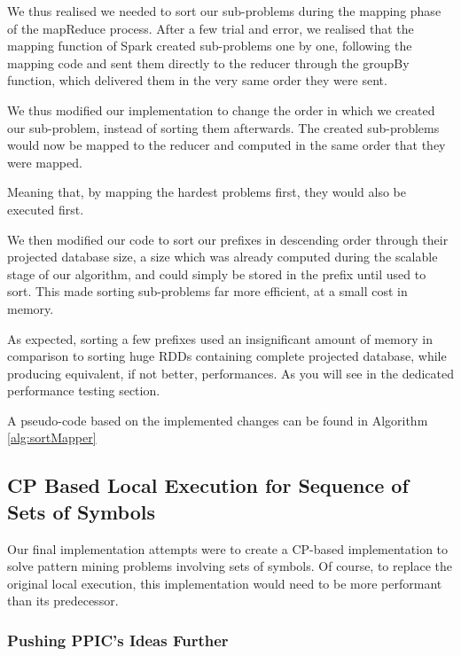 \documentclass{eplmastersthesis}
\begin{document}
We thus realised we needed to sort our sub-problems during the mapping phase of the mapReduce process. After a few trial and error, we realised that the mapping function of Spark created sub-problems one by one, following the mapping code and sent them directly to the reducer through the groupBy function, which delivered them in the very same order they were sent. \newline

We thus modified our implementation to change the order in which we created our sub-problem, instead of sorting them afterwards. The created sub-problems would now be mapped to the reducer and computed in the same order that they were mapped.\newline

Meaning that, by mapping the hardest problems first, they would also be executed first. \newline

We then modified our code to sort our prefixes in descending order through their projected database size, a size which was already computed during the scalable stage of our algorithm, and could simply be stored in the prefix until used to sort. This made sorting sub-problems far more efficient, at a small cost in memory. \newline

As expected, sorting a few prefixes used an insignificant amount of memory in comparison to sorting huge RDDs containing complete projected database, while producing equivalent, if not better, performances. As you will see in the dedicated performance testing section. \newline

A pseudo-code based on the implemented changes can be found in Algorithm \ref{alg:sortMapper}

\subsection{CP Based Local Execution for Sequence of Sets of Symbols}

Our final implementation attempts were to create a CP-based implementation to solve pattern mining problems involving sets of symbols. Of course, to replace the original local execution, this implementation would need to be more performant than its predecessor.

\subsubsection{Pushing PPIC's Ideas Further}
\end{document}
